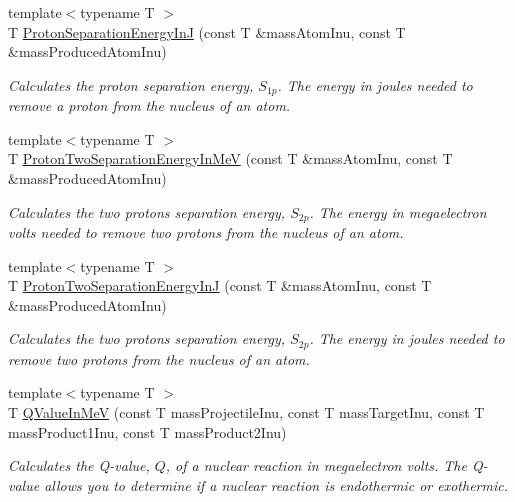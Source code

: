 \begin{DoxyCompactItemize}
{\footnotesize template$<$typename T $>$ }\\T \mbox{\hyperlink{group___e_g_x_phys-_nuclear_separation_energy_ga4274d8f5a3860169fd81970707eb582a}{Proton\+Separation\+Energy\+InJ}} (const T \&mass\+Atom\+Inu, const T \&mass\+Produced\+Atom\+Inu)
\begin{DoxyCompactList}\small\item\em Calculates the proton separation energy, $S_{1p}$. The energy in joules needed to remove a proton from the nucleus of an atom. \end{DoxyCompactList}\item 
{\footnotesize template$<$typename T $>$ }\\T \mbox{\hyperlink{group___e_g_x_phys-_nuclear_separation_energy_ga0de42783a7c650eb32f85dc2d40d84d7}{Proton\+Two\+Separation\+Energy\+In\+MeV}} (const T \&mass\+Atom\+Inu, const T \&mass\+Produced\+Atom\+Inu)
\begin{DoxyCompactList}\small\item\em Calculates the two protons separation energy, $S_{2p}$. The energy in megaelectron volts needed to remove two protons from the nucleus of an atom. \end{DoxyCompactList}\item 
{\footnotesize template$<$typename T $>$ }\\T \mbox{\hyperlink{group___e_g_x_phys-_nuclear_separation_energy_gad7c1d4a32daa8aaa53c5fce37c421f82}{Proton\+Two\+Separation\+Energy\+InJ}} (const T \&mass\+Atom\+Inu, const T \&mass\+Produced\+Atom\+Inu)
\begin{DoxyCompactList}\small\item\em Calculates the two protons separation energy, $S_{2p}$. The energy in joules needed to remove two protons from the nucleus of an atom. \end{DoxyCompactList}\item 
{\footnotesize template$<$typename T $>$ }\\T \mbox{\hyperlink{group___e_g_x_phys-_q_value_gab96ade2d74f5303e30a43ff97bd03841}{Q\+Value\+In\+MeV}} (const T mass\+Projectile\+Inu, const T mass\+Target\+Inu, const T mass\+Product1\+Inu, const T mass\+Product2\+Inu)
\begin{DoxyCompactList}\small\item\em Calculates the Q-\/value, $Q$, of a nuclear reaction in megaelectron volts. The Q-\/value allows you to determine if a nuclear reaction is endothermic or exothermic. \end{DoxyCompactList}\item 

\end{DoxyCompactItemize}
